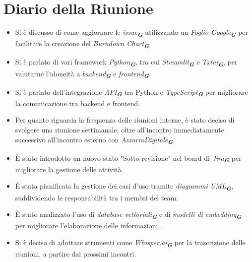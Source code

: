 
\section{Diario della Riunione}

\begin{itemize}
    \item Si è discusso di come aggiornare le \emph{issue}\textsubscript{\textbf{\textit{G}}} utilizzando un \emph{Foglio Google}\textsubscript{\textbf{\textit{G}}} per facilitare la creazione del \emph{Burndown Chart}\textsubscript{\textbf{\textit{G}}}.
    \item Si è parlato di vari framework \emph{Python}\textsubscript{\textbf{\textit{G}}}, tra cui \emph{Streamlit}\textsubscript{\textbf{\textit{G}}} e \emph{Txtai}\textsubscript{\textbf{\textit{G}}}, per valutarne l’idoneità a \emph{backend}\textsubscript{\textbf{\textit{G}}} e \emph{frontend}\textsubscript{\textbf{\textit{G}}}.
    \item Si è parlato dell'integrazione \emph{API}\textsubscript{\textbf{\textit{G}}} tra Python e \emph{TypeScript}\textsubscript{\textbf{\textit{G}}} per migliorare la comunicazione tra backend e frontend.
    \item Per quanto riguarda la frequenza delle riunioni interne, è stato deciso di svolgere una riunione settimanale, oltre all'incontro 
    immediatamente successivo all'incontro esterno con \emph{AzzurroDigitale}\textsubscript{\textbf{\textit{G}}}.
    \item È stato introdotto un nuovo stato "Sotto revisione" nel board di \emph{Jira}\textsubscript{\textbf{\textit{G}}} per migliorare la gestione delle attività.
    \item È stata pianificata la gestione dei casi d’uso tramite \emph{diagrammi UML}\textsubscript{\textbf{\textit{G}}}, suddividendo le responsabilità tra i membri del team.
    \item È stato analizzato l'uso di \emph{database vettoriali}\textsubscript{\textbf{\textit{G}}} e di \emph{modelli di embedding}\textsubscript{\textbf{\textit{G}}} per migliorare l’elaborazione delle informazioni.
    \item Si è deciso di adottare strumenti come \emph{Whisper.ai}\textsubscript{\textbf{\textit{G}}} per la trascrizione delle riunioni, a partire dai prossimi incontri.
\end{itemize}
